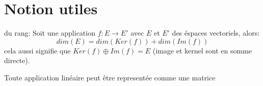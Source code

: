 \section{Notion utiles}
\begin{theorem}
   du rang: Soit une application $f: E \to E'$ avec $E$ et  $E'$ des éspaces vectoriels, alors: 
   \[
        dim(E) = dim(Ker(f)) + dim(Im(f)) 
   \] 
   cela aussi signifie que $Ker(f) \oplus  Im(f) = E$ (image et kernel sont en somme directe). 
\end{theorem}
\begin{intuition}
   Toute application linéaire peut être representée comme une matrice 
\end{intuition}

